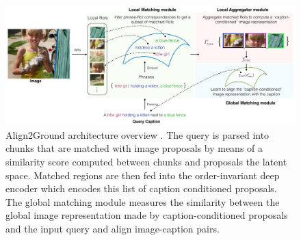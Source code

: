 \begin{figure}
  \centering
  \includegraphics[width=.8\textwidth]{figures/align2ground-model.png}
  \caption[Align2Ground architecture overview]{Align2Ground
  architecture overview \cite{datta2019align2ground}. The query is
  parsed into chunks that are matched with image proposals by means of
  a similarity score computed between chunks and proposals the latent
  space. Matched regions are then fed into the order-invariant deep
  encoder which encodes this list of caption conditioned proposals.
  The global matching module measures the similarity between the
  global image representation made by caption-conditioned proposals
  and the input query and align image-caption pairs.}
  \label{fig:align2ground-model}
\end{figure}

